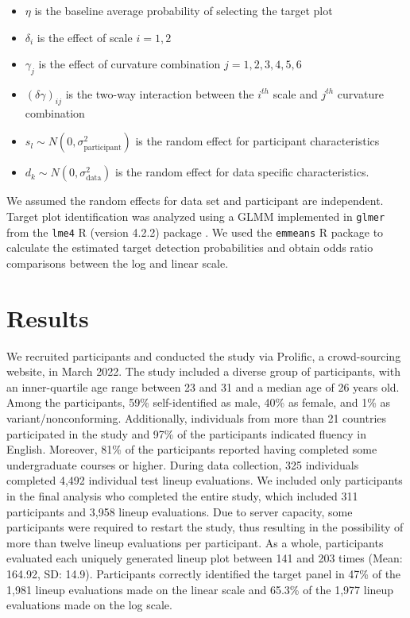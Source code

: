 \documentclass[12pt]{article}
\begin{document}
\begin{itemize}
\item $\eta$ is the baseline average probability of selecting the target plot
\item $\delta_i$ is the effect of scale $i = 1,2$
\item $\gamma_j$ is the effect of curvature combination $j = 1,2,3,4,5,6$
\item $(\delta\gamma)_{ij}$ is the two-way interaction between the $i^{th}$ scale and $j^{th}$ curvature combination
\item $s_l \sim N(0,\sigma^2_\text{participant})$ is the random effect for participant characteristics
\item $d_k \sim N(0,\sigma^2_{\text{data}})$ is the random effect for data specific characteristics. 
\end{itemize}

\noindent We assumed the random effects for data set and participant are
independent. Target plot identification was analyzed using a GLMM
implemented in \texttt{glmer} from the \texttt{lme4} R (version 4.2.2)
package \citep{lme4}. We used the \texttt{emmeans} R package
\citep{emmeans} to calculate the estimated target detection
probabilities and obtain odds ratio comparisons between the log and
linear scale.

\hypertarget{results}{%
\section{Results}\label{results}}

We recruited participants and conducted the study via Prolific, a
crowd-sourcing website, in March 2022. The study included a diverse
group of participants, with an inner-quartile age range between 23 and
31 and a median age of 26 years old. Among the participants, 59\%
self-identified as male, 40\% as female, and 1\% as
variant/nonconforming. Additionally, individuals from more than 21
countries participated in the study and 97\% of the participants
indicated fluency in English. Moreover, 81\% of the participants
reported having completed some undergraduate courses or higher. During
data collection, 325 individuals completed 4,492 individual test lineup
evaluations. We included only participants in the final analysis who
completed the entire study, which included 311 participants and 3,958
lineup evaluations. Due to server capacity, some participants were
required to restart the study, thus resulting in the possibility of more
than twelve lineup evaluations per participant. As a whole, participants
evaluated each uniquely generated lineup plot between 141 and 203 times
(Mean: 164.92, SD: 14.9). Participants correctly identified the target
panel in 47\% of the 1,981 lineup evaluations made on the linear scale
and 65.3\% of the 1,977 lineup evaluations made on the log scale.
\end{document}
